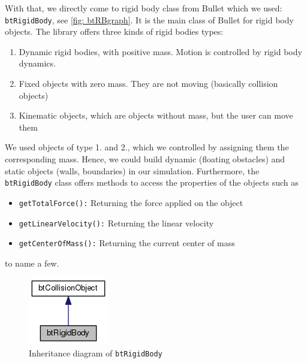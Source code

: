 With that, we directly come to rigid body class from Bullet which we used: \verb+btRigidBody+, see \autoref{fig: btRBgraph}. It is the main class of Bullet for rigid body objects. The library offers three kinds of rigid bodies types:
\begin{enumerate}
\item Dynamic rigid bodies, with positive mass. Motion is controlled by rigid body dynamics.
\item Fixed objects with zero mass. They are not moving (basically collision objects)
\item Kinematic objects, which are objects without mass, but the user can move them
\end{enumerate}
We used objects of type 1. and 2., which we controlled by assigning them the corresponding mass. Hence, we could build dynamic (floating obstacles) and static objects (walls, boundaries) in our simulation. Furthermore, the \texttt{btRigidBody} class offers methods to access the properties of the objects such as 
\begin{itemize}
\item \texttt{getTotalForce():} Returning the force applied on the object
\item \texttt{getLinearVelocity():} Returning the linear velocity
\item \texttt{getCenterOfMass():} Returning the current center of mass
\end{itemize}
to name a few. 
\begin{figure}
\centering
\includegraphics[scale=0.5]{img/RigidBodies/btRigidBodyGraph.png}
\caption{Inheritance diagram of \texttt{btRigidBody}}
\label{fig: btRBgraph}
\end{figure}


